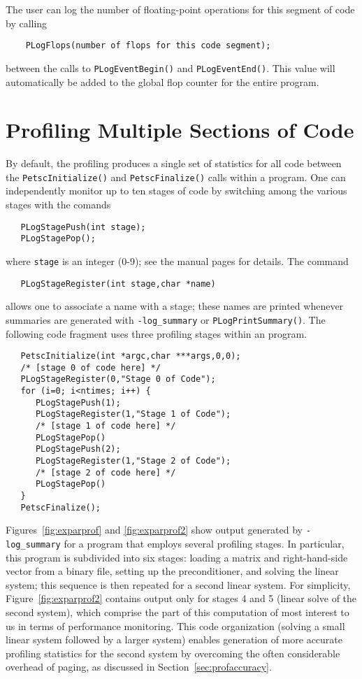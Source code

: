 The user can log the number of floating-point operations 
for this segment of code by calling 
\begin{verbatim}
    PLogFlops(number of flops for this code segment);
\end{verbatim}
between the calls to {\tt PLogEventBegin()} and {\tt PLogEventEnd()}.
This value will automatically be added to the global flop counter for the
entire program.

\section{Profiling Multiple Sections of Code}
\label{sec:profstages}

By default, the profiling produces a single set of statistics for all
code between the {\tt PetscInitialize()} and {\tt PetscFinalize()}
calls within a program.  One can independently monitor up to ten
stages of code by switching among the various stages with the comands
 
\begin{verbatim}
   PLogStagePush(int stage);
   PLogStagePop();
\end{verbatim}
where {\tt stage} is an integer (0-9); see the manual pages for details.
The command  
\begin{verbatim}
   PLogStageRegister(int stage,char *name)
\end{verbatim}
allows one to associate a name with a stage; these names are printed whenever
summaries are generated with {\tt -log\_summary} or {\tt PLogPrintSummary()}.
The following code fragment uses three profiling stages within an program.

\begin{verbatim}
   PetscInitialize(int *argc,char ***args,0,0);
   /* [stage 0 of code here] */
   PLogStageRegister(0,"Stage 0 of Code");
   for (i=0; i<ntimes; i++) {
      PLogStagePush(1);
      PLogStageRegister(1,"Stage 1 of Code");
      /* [stage 1 of code here] */
      PLogStagePop()
      PLogStagePush(2);
      PLogStageRegister(1,"Stage 2 of Code");
      /* [stage 2 of code here] */
      PLogStagePop()
   }
   PetscFinalize();
\end{verbatim}

Figures~\ref{fig:exparprof} and \ref{fig:exparprof2} show output
generated by {\tt -log\_summary} for a program that employs
several profiling stages.  In particular, this program is
subdivided into six stages: loading a matrix and right-hand-side
vector from a binary file, setting up the preconditioner, and solving
the linear system; this sequence is then repeated for a second linear
system.  For simplicity, Figure~\ref{fig:exparprof2} contains output
only for stages 4 and 5 (linear solve of the second system), which comprise
the part of this computation of most interest to us in terms of
performance monitoring.  This code organization (solving a small
linear system followed by a larger system) enables generation of more
accurate profiling statistics for the second system by overcoming the
often considerable overhead of paging, as discussed in
Section~\ref{sec:profaccuracy}.

